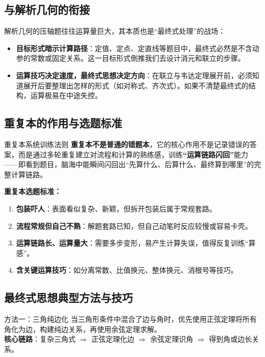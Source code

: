 \documentclass[11pt,a4paper]{ctexart}
\begin{document}
\subsection{与解析几何的衔接}

解析几何的压轴题往往运算量巨大，其本质也是“最终式处理”的战场：
\begin{itemize}
  \item \textbf{目标形式暗示计算路径}：定值、定点、定直线等题目中，最终式必然是不含动参的常数或固定关系。这一目标形式倒推我们去设计消元和联立的步骤。
  \item \textbf{运算技巧决定速度，最终式思想决定方向}：在联立与韦达定理展开前，必须知道展开后要整理出怎样的形式（如对称式、齐次式）。如果不清楚最终式的结构，运算极易在中途失控。
\end{itemize}

\subsection{重复本的作用与选题标准}

\begin{keybox}{重复本系统训练法则}
  \textbf{重复本不是普通的错题本}，它的核心作用不是记录错误的答案，而是通过多轮重复建立对流程和计算的熟练感，训练\textbf{“运算链路闪回”}能力——即看到题目，脑海中能瞬间闪回出“先算什么、后算什么、最终算到哪里”的完整计算链路。
\end{keybox}

\textbf{重复本选题标准：}
\begin{enumerate}
  \item \textbf{包装吓人}：表面看似复杂、新颖，但拆开包装后属于常规套路。
  \item \textbf{流程常规但自己不熟}：解题套路已知，但自己动笔时反应较慢或容易卡壳。
  \item \textbf{运算链路长、运算量大}：需要多步变形，易产生计算失误，值得反复训练“算感”。
  \item \textbf{含关键运算技巧}：如分离常数、比值换元、整体换元、消根号等技巧。
\end{enumerate}

\subsection{最终式思想典型方法与技巧}

\begin{theorembox}{方法一：三角纯边化}
  当三角形条件中混合了边与角时，优先使用正弦定理将所有角化为边，构建纯边关系，再使用余弦定理求解。\\
  \textbf{核心链路}：复杂三角式 $\Longrightarrow$ 正弦定理化边 $\Longrightarrow$ 余弦定理识角 $\Longrightarrow$ 得到角或边长关系。
\end{theorembox}
\end{document}

